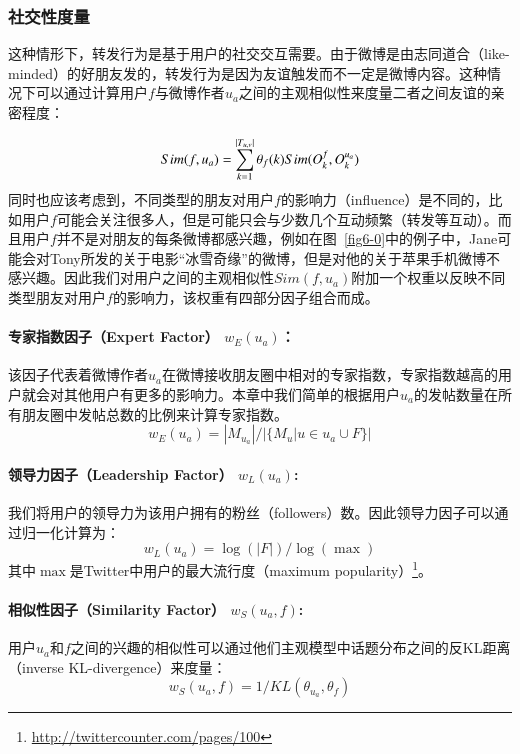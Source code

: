 \subsubsection{社交性度量}
这种情形下，转发行为是基于用户的社交交互需要。由于微博是由志同道合（like-minded）的好朋友发的，转发行为是因为友谊触发而不一定是微博内容。这种情况下可以通过计算用户$ f $与微博作者$ u_a $之间的主观相似性来度量二者之间友谊的亲密程度：

\begin{equation}
Sim(f,u_a)=\sum_{k=1}^{|T_{u,v}|}\theta_{f}(k)\* Sim(O_{k}^{f},O_{k}^{u_a})
\end{equation}
同时也应该考虑到，不同类型的朋友对用户$ f $的影响力（influence）是不同的，比如用户$ f $可能会关注很多人，但是可能只会与少数几个互动频繁（转发等互动）。而且用户$ f $并不是对朋友的每条微博都感兴趣，例如在图~\ref{fig6-0}中的例子中，Jane可能会对Tony所发的关于电影“冰雪奇缘”的微博，但是对他的关于苹果手机微博不感兴趣。因此我们对用户之间的主观相似性$ Sim(f,u_a) $附加一个权重以反映不同类型朋友对用户$ f $的影响力，该权重有四部分因子组合而成。

\paragraph{专家指数因子（Expert Factor） $ w_E(u_a) $：} 
该因子代表着微博作者$ u_a $在微博接收朋友圈中相对的专家指数，专家指数越高的用户就会对其他用户有更多的影响力。本章中我们简单的根据用户$ u_a $的发帖数量在所有朋友圈中发帖总数的比例来计算专家指数。
\begin{equation}
w_E(u_a)=|M_{u_a}|/|\{M_u|u \in u_a \cup F \}|
\end{equation}

\paragraph{领导力因子（Leadership Factor） $ w_L(u_a) $:} 
我们将用户的领导力为该用户拥有的粉丝（followers）数。因此领导力因子可以通过归一化计算为：
\begin{equation}
w_L(u_a)=\log (|F|)/\log(\max)
\end{equation}
其中$ \max $是Twitter中用户的最大流行度（maximum popularity）\footnote{\url{http://twittercounter.com/pages/100}}。

\paragraph{相似性因子（Similarity Factor） $ w_S(u_a,f) $:} 
用户$ u_a $和$ f $之间的兴趣的相似性可以通过他们主观模型中话题分布之间的反KL距离（inverse KL-divergence）来度量：
\begin{equation}
w_S(u_a,f)= 1/KL(\theta_{u_a},\theta_f)
\end{equation}

